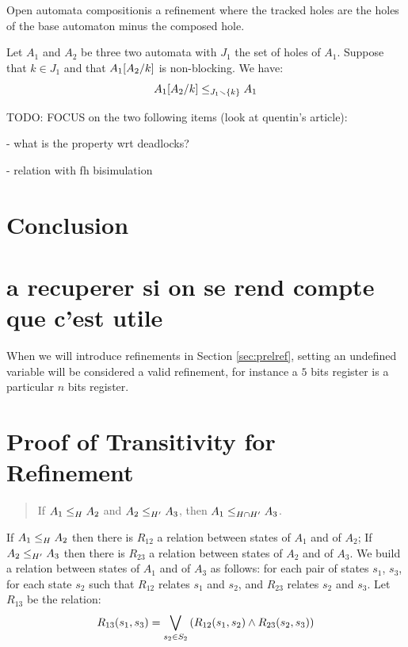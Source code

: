 \documentclass[runningheads]{llncs}
\begin{document}
Open automata compositionis a refinement where
the tracked holes are the holes of the base automaton minus the composed hole.
\begin{theorem}\label{thm:Composition}
Let $A_1$ and  $A_2$  be three two automata with $J_1$ the set of holes of $A_1$.
Suppose that \(k \in J_1\) and that \(A_1\subst{A_2}{k}\) is non-blocking. We have:
\[ \wrel{A_1\subst{A_2}{k}}{A_1}{J_1\setminus \{k\}}\]
\end{theorem}


TODO: FOCUS on the two following items (look at quentin's article):


- what is the property wrt deadlocks?


- relation with fh bisimulation



\section{Conclusion}\label{sec:ccl}


 
 

\section{a recuperer si on se rend compte que c'est utile}
When we will introduce refinements in Section \ref{sec:prelref}, setting an undefined variable will be considered a valid refinement, for instance a \(5\) bits register is a particular \(n\) bits register.


\appendix

\section{Proof of Transitivity for Refinement}\label{sec:proof-transitivity}
\begin{quote}
If $\wrel{A_1}{A_2}{H}$ and $\wrel{A_2}{A_3}{H'}$, then $\wrel{A_1}{A_3}{H\cap H'}$.
\end{quote}
\proof 
If $\wrel{A_1}{A_2}{H}$ then there is $R_{12}$ a relation between states
of $A_1$ and of $A_2$;  If $\wrel{A_2}{A_3}{H'}$ then there is $R_{23}$ a relation between states of $A_2$ and of $A_3$. We build a relation between
 states of $A_1$ and of $A_3$ as follows:  for each pair of states $s_1$, $s_3$, for each state $s_2$ such that $R_{12}$ relates $s_1$ and $s_2$, and $R_{23}$ relates $s_2$ and $s_3$.
Let $R_{13}$ be the relation:\\
  \[R_{13}(s_1,s_3)=\bigvee_{s_2\in S_2}\mpar{R_{12}(s_1,s_2) \land R_{23}(s_2,s_3) } \]
\end{document}
